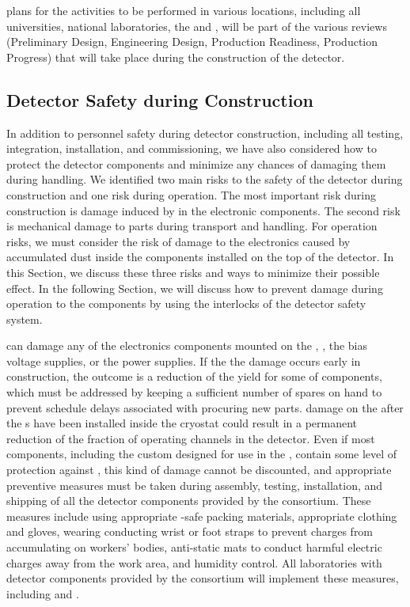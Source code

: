  plans for the activities to be performed in various
locations, including all universities, national laboratories,
the  and , will be part of the 
various reviews (Preliminary Design, Engineering Design, Production 
Readiness, Production Progress) that will take place during the construction of the detector.

\subsection{Detector Safety during Construction}
\label{sec:fdsp-tpcelec-safety-detcon}


In addition to personnel safety during detector
construction, including all testing, 
integration, installation, and commissioning, we have also
considered how to protect the detector
components and minimize any chances of damaging
them during handling. We identified two main risks 
to the safety of the detector during construction and one risk during
operation. The most important risk during construction is damage 
induced by  in the 
electronic components. The second risk is mechanical damage to 
parts during transport and handling. For operation risks, we
must consider the risk of damage to the electronics 
caused by accumulated dust inside the components
installed on the top of the detector. In this Section, 
we discuss these three risks and ways to minimize their possible 
effect. In the following Section, we will discuss how to prevent
damage during operation to the  components 
by using the interlocks of the detector safety system.

 can damage any of the electronics
components mounted on the , ,
the bias voltage supplies, or the power supplies. If the
the damage occurs early in construction, 
the outcome is a reduction
of the yield for some of components, which must be
addressed by keeping a sufficient number of spares on hand to prevent
schedule delays associated with procuring new parts. 
damage on the  after the s have been
installed inside the cryostat could result in a permanent
reduction of the fraction of operating channels in the
detector. Even if most components, including the custom 
 designed for use in the , contain 
some level of protection  against , this kind of damage cannot be discounted, and appropriate 
preventive measures must be taken during  
assembly, testing, installation, and shipping of all the detector 
components provided by the  consortium. These 
measures include using appropriate -safe packing materials, 
appropriate clothing and gloves, wearing conducting wrist or foot straps 
to prevent charges from accumulating 
on workers' bodies, anti-static mats to conduct harmful electric 
charges away from the work area, and humidity control. All laboratories with detector components provided by the  consortium will implement these
measures,
including  and . 

